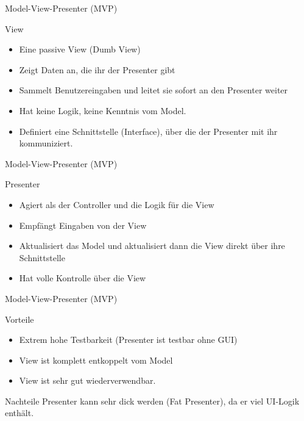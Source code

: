 \begin{frame}{Model-View-Presenter (MVP)}
	\begin{block}{View}
		\begin{itemize}
		  \item Eine passive View (Dumb View)
		  \item Zeigt Daten an, die ihr der Presenter gibt
		  \item Sammelt Benutzereingaben und leitet sie sofort an den Presenter weiter
		  \item Hat keine Logik, keine Kenntnis vom Model. 
		  \item Definiert eine Schnittstelle (Interface), über die der Presenter mit ihr kommuniziert. 
		\end{itemize}
	\end{block}
\end{frame}

\begin{frame}{Model-View-Presenter (MVP)}
	\begin{block}{Presenter}
		\begin{itemize}
		  \item Agiert als der Controller und die Logik für die View
		  \item Empfängt Eingaben von der View
		  \item Aktualisiert das Model und aktualisiert dann die View direkt über ihre Schnittstelle
		  \item Hat volle Kontrolle über die View 
		\end{itemize}
	\end{block}
\end{frame}

\begin{frame}{Model-View-Presenter (MVP)}
	\begin{exampleblock}{Vorteile}
		\begin{itemize}
		  \item Extrem hohe Testbarkeit (Presenter ist testbar ohne GUI)
		  \item View ist komplett entkoppelt vom Model
		  \item View ist sehr gut wiederverwendbar.
		\end{itemize}
	\end{exampleblock}
	\pause
	\begin{alertblock}{Nachteile}
		 Presenter kann sehr dick werden (Fat Presenter), da er viel UI-Logik 
		 enthält.
	\end{alertblock}
\end{frame}

